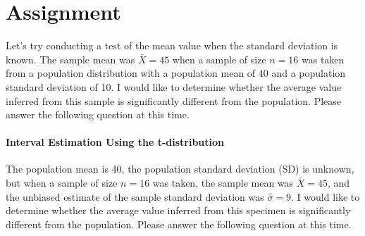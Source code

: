 \documentclass{ltjsbook}
\begin{document}
\section{Assignment}
Let's try conducting a test of the mean value when the standard deviation is known.
The sample mean was $\bar{X}=45$ when a sample of size $n=16$ was taken from a population distribution with a population mean of 40 and a population standard deviation of 10.
I would like to determine whether the average value inferred from this sample is significantly different from the population.
Please answer the following question at this time.


\paragraph{Interval Estimation Using the t-distribution}
The population mean is 40, the population standard deviation (SD) is unknown, but when a sample of size $n=16$ was taken, the sample mean was $\bar{X}=45$, and the unbiased estimate of the sample standard deviation was $\hat{\sigma}=9$.
I would like to determine whether the average value inferred from this specimen is significantly different from the population.
Please answer the following question at this time.


\end{document}
